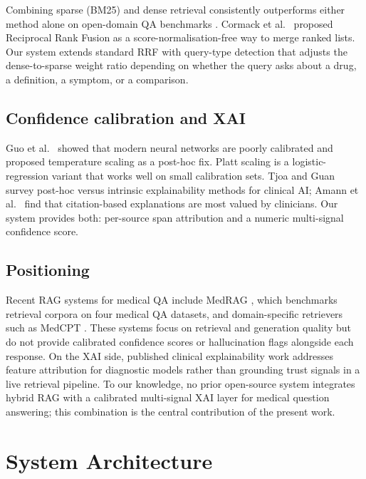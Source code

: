 \documentclass[conference,a4paper]{IEEEtran}
\begin{document}
Combining sparse (BM25) and dense retrieval consistently outperforms
either method alone on open-domain QA benchmarks \cite{ma2022hybrid}.
Cormack et al.\ \cite{cormack2009rrf} proposed Reciprocal Rank Fusion
as a score-normalisation-free way to merge ranked lists.
Our system extends standard RRF with query-type detection that adjusts
the dense-to-sparse weight ratio depending on whether the query asks about
a drug, a definition, a symptom, or a comparison.

\subsection{Confidence calibration and XAI}

Guo et al.\ \cite{guo2017calibration} showed that modern neural networks
are poorly calibrated and proposed temperature scaling as a post-hoc fix.
Platt scaling \cite{platt1999probabilistic} is a logistic-regression
variant that works well on small calibration sets.
Tjoa and Guan \cite{tjoa2020survey} survey post-hoc versus intrinsic
explainability methods for clinical AI; Amann et al.\ \cite{amann2020xai}
find that citation-based explanations are most valued by clinicians.
Our system provides both: per-source span attribution and a numeric
multi-signal confidence score.

\subsection{Positioning}

Recent RAG systems for medical QA include MedRAG \cite{xiong2024medrag},
which benchmarks retrieval corpora on four medical QA datasets, and
domain-specific retrievers such as MedCPT \cite{jin2023medcpt}.
These systems focus on retrieval and generation quality but do not
provide calibrated confidence scores or hallucination flags alongside
each response.
On the XAI side, published clinical explainability work addresses
feature attribution for diagnostic models \cite{tjoa2020survey} rather
than grounding trust signals in a live retrieval pipeline.
To our knowledge, no prior open-source system integrates hybrid RAG
with a calibrated multi-signal XAI layer for medical question answering;
this combination is the central contribution of the present work.

\section{System Architecture}
\label{sec:arch}
\end{document}
